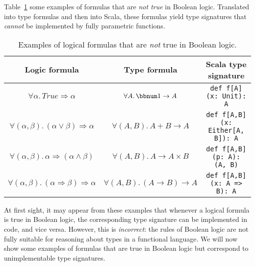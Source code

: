 Table~\ref{tab:Logical-formulas-not-Boolean-theorems} some examples
of formulas that are \emph{not true} in Boolean logic. Translated
into type formulas and then into Scala, these formulas yield type
signatures that \emph{cannot} be implemented by fully parametric functions.

\begin{table}
\begin{centering}
\begin{tabular}{|c|c|c|}
\hline 
\textbf{\small{}Logic formula} & \textbf{\small{}Type formula} & \textbf{\small{}Scala type signature}\tabularnewline
\hline 
\hline 
{\footnotesize{}$\forall\alpha.\,True\Rightarrow\alpha$} & {\footnotesize{}$\forall A.\,\bbnum 1\rightarrow A$} & \lstinline!def f[A](x: Unit): A!\tabularnewline
\hline 
{\footnotesize{}$\forall(\alpha,\beta).\,(\alpha\vee\beta)\Rightarrow\alpha$} & {\footnotesize{}$\forall(A,B).\,A+B\rightarrow A$} & \lstinline!def f[A,B](x: Either[A, B]): A!\tabularnewline
\hline 
{\footnotesize{}$\forall(\alpha,\beta).\,\alpha\Rightarrow(\alpha\wedge\beta)$} & {\footnotesize{}$\forall(A,B).\,A\rightarrow A\times B$} & \lstinline!def f[A,B](p: A): (A, B)!\tabularnewline
\hline 
{\footnotesize{}$\forall(\alpha,\beta).\,(\alpha\Rightarrow\beta)\Rightarrow\alpha$} & {\footnotesize{}$\forall(A,B).\,(A\rightarrow B)\rightarrow A$} & \lstinline!def f[A,B](x: A => B): A!\tabularnewline
\hline 
\end{tabular}
\par\end{centering}
\caption{Examples of logical formulas that are \emph{not} true in Boolean logic.\label{tab:Logical-formulas-not-Boolean-theorems}}
\end{table}

At first sight, it may appear from these examples that whenever a
logical formula is true in Boolean logic, the corresponding type signature
can be implemented in code, and vice versa. However, this is \emph{incorrect}:
the rules of Boolean logic are not fully suitable for reasoning about
types in a functional language. We will now show some examples of
formulas that are true in Boolean logic but correspond to unimplementable
type signatures.

